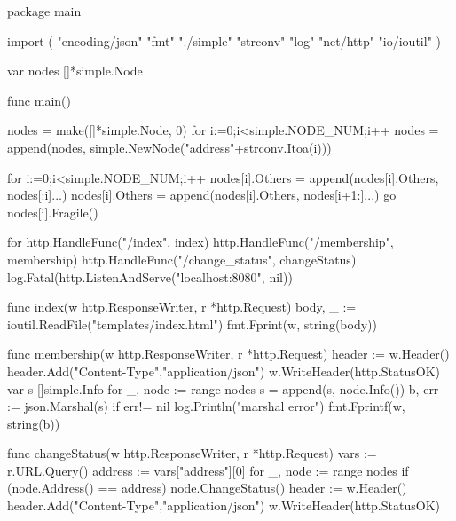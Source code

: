 \begin{codeblock}[language=GO]
    package main

import (
	"encoding/json"
	"fmt"
    "./simple"
    "strconv"
    "log"
    "net/http"
    "io/ioutil"
)

var nodes []*simple.Node

func main() {
    nodes = make([]*simple.Node, 0)
    for i:=0;i<simple.NODE_NUM;i++ {
        nodes = append(nodes, simple.NewNode("address"+strconv.Itoa(i)))
    }

    for i:=0;i<simple.NODE_NUM;i++ {
        nodes[i].Others = append(nodes[i].Others, nodes[:i]...)
        nodes[i].Others = append(nodes[i].Others, nodes[i+1:]...)
        go nodes[i].Fragile()
    }

    for {
        http.HandleFunc("/index", index)
        http.HandleFunc("/membership", membership)
        http.HandleFunc("/change_status", changeStatus)
        log.Fatal(http.ListenAndServe("localhost:8080", nil))
    }
}

func index(w http.ResponseWriter, r *http.Request) {
    body, _ := ioutil.ReadFile("templates/index.html")
    fmt.Fprint(w, string(body))
}

func membership(w http.ResponseWriter, r *http.Request) {
    header := w.Header()
    header.Add("Content-Type","application/json")
    w.WriteHeader(http.StatusOK)
    var s []simple.Info
    for _, node := range nodes {
        s = append(s, node.Info())
    }
    b, err := json.Marshal(s)
    if err!= nil {
        log.Println("marshal error")
    }
    fmt.Fprintf(w, string(b))
}

func changeStatus(w http.ResponseWriter, r *http.Request) {
    vars := r.URL.Query() 
    address := vars["address"][0]
    for _, node := range nodes {
        if (node.Address() == address) {
            node.ChangeStatus()
        }
    }
    header := w.Header()
    header.Add("Content-Type","application/json")
    w.WriteHeader(http.StatusOK)
}


\end{codeblock}